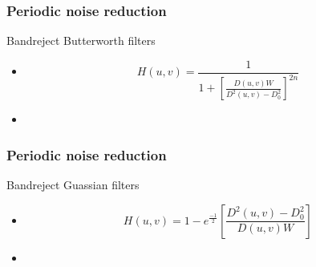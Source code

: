 \documentclass{beamer}
\begin{document}
\begin{frame}
\frametitle{Periodic noise reduction}
\begin{block}{Bandreject Butterworth filters}
\begin{itemize}
\item[] 
	\[
 	H(u,v) = \frac{1}{1+\left[ \frac{D(u,v)W}{D^2(u,v)-D_{0}^2}\right]^{2n}}
  	\]
\item[] 
\end{itemize}
\end{block}
\end{frame}
\begin{frame}
\frametitle{Periodic noise reduction}
\begin{block}{Bandreject Guassian filters}
\begin{itemize}
\item[] 
	\[
 	H(u,v) = 1 - e^\frac{-1}{2}\left[\frac{D^2(u,v)-D_{0}^2}{D(u,v)W}\right]
  	\]
\item[] 
\end{itemize}
\end{block}
\end{frame}
\end{document}
